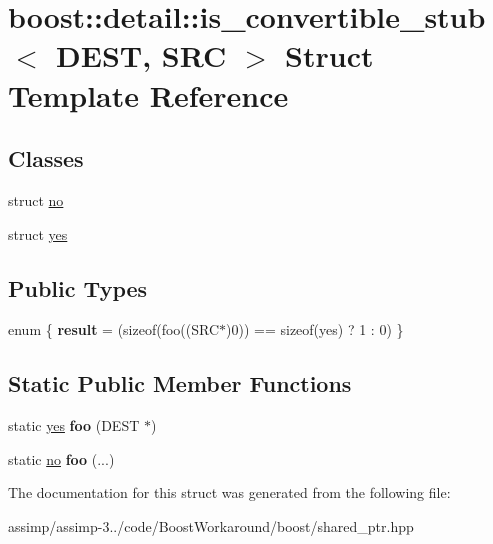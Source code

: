 \hypertarget{structboost_1_1detail_1_1is__convertible__stub}{\section{boost\+:\+:detail\+:\+:is\+\_\+convertible\+\_\+stub$<$ D\+E\+S\+T, S\+R\+C $>$ Struct Template Reference}
\label{structboost_1_1detail_1_1is__convertible__stub}
}
\subsection*{Classes}
\begin{DoxyCompactItemize}
\item 
struct \hyperlink{structboost_1_1detail_1_1is__convertible__stub_1_1no}{no}
\item 
struct \hyperlink{structboost_1_1detail_1_1is__convertible__stub_1_1yes}{yes}
\end{DoxyCompactItemize}
\subsection*{Public Types}
\begin{DoxyCompactItemize}
\item 
\hypertarget{structboost_1_1detail_1_1is__convertible__stub_af482319c695aa4712f8cd308fbb748eb}{enum \{ {\bfseries result} = (sizeof(foo((S\+R\+C$\ast$)0)) == sizeof(yes) ? 1 \+: 0)
 \}}\label{structboost_1_1detail_1_1is__convertible__stub_af482319c695aa4712f8cd308fbb748eb}

\end{DoxyCompactItemize}
\subsection*{Static Public Member Functions}
\begin{DoxyCompactItemize}
\item 
\hypertarget{structboost_1_1detail_1_1is__convertible__stub_a77f7f952d69f0c57b3d2584d71eac38b}{static \hyperlink{structboost_1_1detail_1_1is__convertible__stub_1_1yes}{yes} {\bfseries foo} (D\+E\+S\+T $\ast$)}\label{structboost_1_1detail_1_1is__convertible__stub_a77f7f952d69f0c57b3d2584d71eac38b}

\item 
\hypertarget{structboost_1_1detail_1_1is__convertible__stub_a95ec928d23ecf2e10fbcde1acda75780}{static \hyperlink{structboost_1_1detail_1_1is__convertible__stub_1_1no}{no} {\bfseries foo} (...)}\label{structboost_1_1detail_1_1is__convertible__stub_a95ec928d23ecf2e10fbcde1acda75780}

\end{DoxyCompactItemize}


The documentation for this struct was generated from the following file\+:\begin{DoxyCompactItemize}
\item 
assimp/assimp-\/3../code/\+Boost\+Workaround/boost/shared\+\_\+ptr.\+hpp\end{DoxyCompactItemize}
